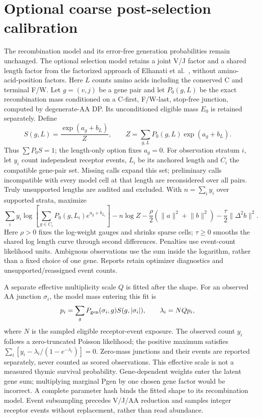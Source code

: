 \documentclass[11pt]{article}
\theoremstyle{oldplain}
\theoremstyle{oldrem}
\begin{document}
\section{Optional coarse post-selection calibration}

The recombination model and its error-free generation probabilities remain
unchanged. The optional selection model retains a joint V/J factor and a shared
length factor from the factorized approach of Elhanati et al.\ \cite{Elhanati2014},
without amino-acid-position factors. Here $L$ counts amino acids including the
conserved C and terminal F/W. Let $g=(v,j)$ be a gene pair and let
$P_0(g,L)$ be the exact recombination mass conditioned on a C-first,
F/W-last, stop-free junction, computed by degenerate-AA DP. Its unconditioned
eligible mass $E_0$ is retained separately. Define
\begin{equation}
 S(g,L)=\frac{\exp(a_g+b_L)}{Z},\qquad
 Z=\sum_{g,L}P_0(g,L)\exp(a_g+b_L).
\end{equation}
Thus $\sum P_0S=1$; the length-only option fixes $a_g=0$.
For observation stratum $i$, let $y_i$ count independent receptor events,
$L_i$ be its anchored length and $C_i$ the compatible gene-pair set.
Missing calls expand this set; preliminary calls incompatible with every model
cell at that length are reconsidered over all pairs. Truly unsupported lengths
are audited and excluded. With $n=\sum_i y_i$ over supported strata, maximize
\begin{equation}
 \sum_i y_i\log\!\left[\sum_{g\in C_i}P_0(g,L_i)e^{a_g+b_{L_i}}\right]
 -n\log Z-\frac{\rho}{2}(\lVert a\rVert^2+\lVert b\rVert^2)
 -\frac{\tau}{2}\lVert\Delta^2 b\rVert^2.
\end{equation}
Here $\rho>0$ fixes the log-weight gauges and shrinks sparse cells;
$\tau\ge0$ smooths the shared log length curve through second differences.
Penalties use event-count likelihood units. Ambiguous observations use the sum
inside the logarithm, rather than a fixed choice of one gene. Reports retain
optimizer diagnostics and unsupported/reassigned event counts.

A separate effective multiplicity scale $Q$ is fitted after the shape. For an
observed AA junction $\sigma_i$, the model mass entering this fit is
\begin{equation}
 p_i=\sum_g P_{\rm gen}(\sigma_i,g)S(g,|\sigma_i|),\qquad
 \lambda_i=NQp_i,
\end{equation}
where $N$ is the sampled eligible receptor-event exposure. The observed count
$y_i$ follows a zero-truncated Poisson likelihood; the positive maximum satisfies
$\sum_i[y_i-\lambda_i/(1-e^{-\lambda_i})]=0$. Zero-mass junctions and their events
are reported separately, never counted as scored observations. This effective
scale is not a measured thymic survival probability. Gene-dependent weights
enter the latent gene sum; multiplying marginal Pgen by one chosen gene factor
would be incorrect. A complete parameter hash binds the fitted shape to its
recombination model. Event subsampling precedes V/J/AA reduction and samples
integer receptor events without replacement, rather than read abundance.
\end{document}
